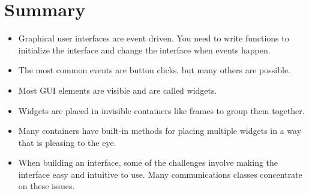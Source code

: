 \documentclass[letterpaper,10pt,english]{sphinxmanual}
\begin{document}
\begin{itemize}
\end{itemize}


\section{Summary}
\label{\detokenize{lecture_notes/lec22_tkinter:summary}}\begin{itemize}
\item {} 
Graphical user interfaces are event driven. You need to write functions
to initialize the interface and change the interface when events happen.

\item {} 
The most common events are button clicks, but many others are possible.

\item {} 
Most GUI elements are visible and are called widgets.

\item {} 
Widgets are placed in invisible containers like frames to group them together.

\item {} 
Many containers have built-in methods for placing multiple widgets in a way
that is pleasing to the eye.

\item {} 
When building an interface, some of the challenges involve making the interface
easy and intuitive to use. Many communications classes concentrate on these
issues.

\end{itemize}
\end{document}
